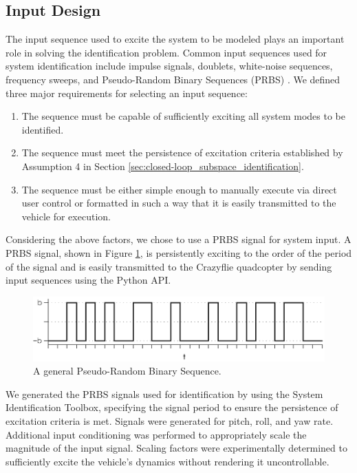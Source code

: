 \subsection{Input Design}
The input sequence used to excite the system to be modeled plays an important role in solving the identification problem. Common input sequences used for system identification include impulse signals, doublets, white-noise sequences, frequency sweeps, and Pseudo-Random Binary Sequences (PRBS) \cite{verhaegen2007filtering}. We defined three major requirements for selecting an input sequence:
\begin{enumerate}
\item The sequence must be capable of sufficiently exciting all system modes to be identified.
\item The sequence must meet the persistence of excitation criteria established by Assumption 4 in Section \ref{sec:closed-loop_subspace_identification}.
\item The sequence must be either simple enough to manually execute via direct user control or formatted in such a way that it is easily transmitted to the vehicle for execution.  
\end{enumerate}
Considering the above factors, we chose to use a PRBS signal for system input. A PRBS signal, shown in Figure \ref{fig:general_prbs}, is persistently exciting to the order of the period of the signal \cite{wilson2005understanding} and is easily transmitted to the Crazyflie quadcopter by sending input sequences using the Python API\@.
\begin{figure}[htb!]
	\centering
	\includegraphics{../fig/general_prbs.eps}
	\caption{A general Pseudo-Random Binary Sequence.}
	\label{fig:general_prbs}
\end{figure}

We generated the PRBS signals used for identification by using the \matlab System Identification Toolbox, specifying the signal period to ensure the persistence of excitation criteria is met. Signals were generated for pitch, roll, and yaw rate. Additional input conditioning was performed to appropriately scale the magnitude of the input signal. Scaling factors were experimentally determined to sufficiently excite the vehicle's dynamics without rendering it uncontrollable.

